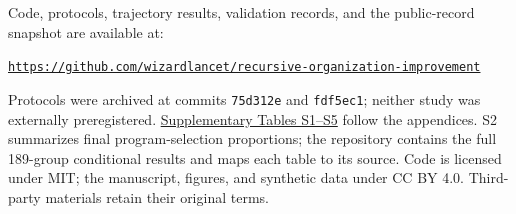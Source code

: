 Code, protocols, trajectory results, validation records, and the public-record snapshot are available at:\par
\noindent\href{https://github.com/wizardlancet/recursive-organization-improvement}{\mbox{\texttt{https://github.com/wizardlancet/recursive-organization-improvement}}}\par
Protocols were archived at commits \texttt{75d312e} and \texttt{fdf5ec1}; neither study was externally preregistered. \hyperref[sec:supplementary-tables]{Supplementary Tables S1--S5} follow the appendices. S2 summarizes final program-selection proportions; the repository contains the full 189-group conditional results and maps each table to its source. Code is licensed under MIT; the manuscript, figures, and synthetic data under CC BY 4.0. Third-party materials retain their original terms.
